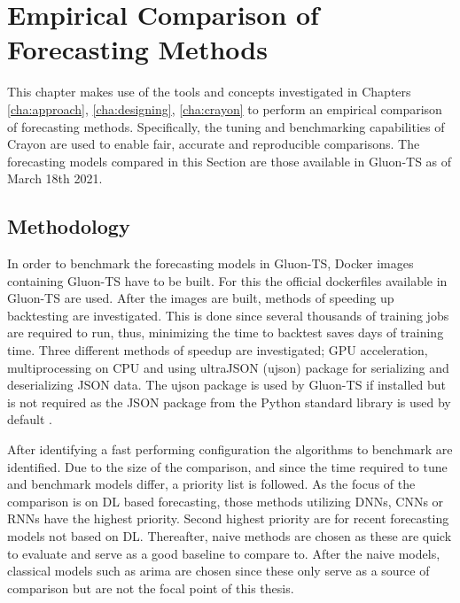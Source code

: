 \chapter{Empirical Comparison of Forecasting Methods\label{cha:chapter6}}

This chapter makes use of the tools and concepts investigated in Chapters \ref{cha:approach}, \ref{cha:designing}, \ref{cha:crayon} to perform an empirical comparison of forecasting methods. Specifically, the tuning and benchmarking capabilities of Crayon are used to enable fair, accurate and reproducible comparisons. The forecasting models compared in this Section are those available in Gluon-TS as of March 18th 2021.


\section{Methodology}
In order to benchmark the forecasting models in Gluon-TS, Docker images containing Gluon-TS have to be built. For this the official dockerfiles available in Gluon-TS are used.  After the images are built, methods of speeding up backtesting are investigated. This is done since several thousands of training jobs are required to run, thus, minimizing the time to backtest saves days of training time. Three different methods of speedup are investigated; GPU acceleration, multiprocessing on CPU and using ultraJSON (ujson) package for serializing and deserializing JSON data. The ujson package is used by Gluon-TS if installed but is not required as the JSON package from the Python standard library is used by default \cite{gluonts-github}.

After identifying a fast performing configuration the algorithms to benchmark are identified. Due to the size of the comparison, and since the time required to tune and benchmark models differ, a priority list is followed. As the focus of the comparison is on DL based forecasting, those methods utilizing DNNs, CNNs or RNNs have the highest priority. Second highest priority are for recent forecasting models not based on DL. Thereafter, naive methods are chosen as these are quick to evaluate and serve as a good baseline to compare to. After the naive models, classical models such as arima are chosen since these only serve as a source of comparison but are not the focal point of this thesis.

